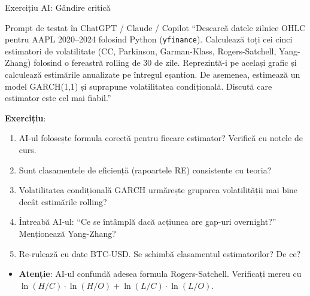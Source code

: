 \documentclass[9pt, aspectratio=169, t]{beamer}
\theoremstyle{definition}
\newenvironment{cminipage}[1]{%
    \par\noindent\hfill\begin{minipage}{#1}\ignorespaces
}{%
    \end{minipage}\hfill\null\par
}
\begin{document}
\begin{frame}[shrink=3]{Exercițiu AI: Gândire critică}
    \begin{cminipage}{0.95\textwidth}
    \begin{block}{\footnotesize Prompt de testat în ChatGPT / Claude / Copilot}
        {\small
        ``Descarcă datele zilnice OHLC pentru AAPL 2020--2024 folosind Python (\texttt{yfinance}).
        Calculează toți cei cinci estimatori de volatilitate (CC, Parkinson, Garman-Klass, Rogers-Satchell, Yang-Zhang)
        folosind o fereastră rolling de 30 de zile. Reprezintă-i pe același grafic și calculează estimările anualizate pe întregul eșantion.
        De asemenea, estimează un model GARCH(1,1) și suprapune volatilitatea condițională. Discută care estimator este cel mai fiabil.''
        }
    \end{block}
    \vspace{-1mm}
    {\small
    \textbf{Exercițiu}:
    \begin{enumerate}
        \item AI-ul folosește formula corectă pentru fiecare estimator? Verifică cu notele de curs.
        \item Sunt clasamentele de eficiență (rapoartele RE) consistente cu teoria?
        \item Volatilitatea condițională GARCH urmărește gruparea volatilității mai bine decât estimările rolling?
        \item Întreabă AI-ul: ``Ce se întâmplă dacă acțiunea are gap-uri overnight?'' Menționează Yang-Zhang?
        \item Re-rulează cu date BTC-USD. Se schimbă clasamentul estimatorilor? De ce?
    \end{enumerate}
    }
    \vspace{-1mm}
    \begin{alertblock}{}
        {\small
        \begin{itemize}\setlength{\itemsep}{0pt}
            \item \textbf{Atenție}: AI-ul confundă adesea formula Rogers-Satchell. Verificați mereu cu $\ln(H/C)\cdot\ln(H/O) + \ln(L/C)\cdot\ln(L/O)$.
        \end{itemize}
        }
    \end{alertblock}
    \end{cminipage}
\end{frame}
\end{document}
